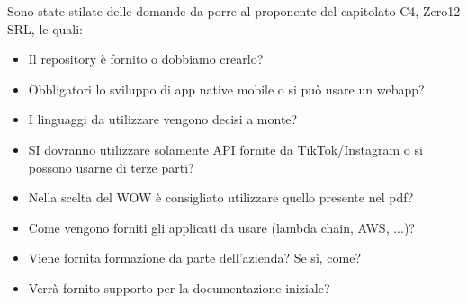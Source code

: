 \documentclass{classes/base}
\begin{document}
    Sono state stilate delle domande da porre al proponente del capitolato C4, Zero12 SRL, le quali:
    \begin{itemize}
        \item  Il repository è fornito o dobbiamo crearlo?
        \item  Obbligatori lo sviluppo di app native mobile o si può usare un webapp?
        \item  I linguaggi da utilizzare vengono decisi a monte?
        \item  SI dovranno utilizzare solamente API fornite da TikTok/Instagram o si possono usarne di terze parti?
        \item  Nella scelta del WOW è consigliato utilizzare quello presente nel pdf?
        \item  Come vengono forniti gli applicati da usare (lambda chain, AWS, ...)?
        \item  Viene fornita formazione da parte dell'azienda? Se sì, come?
        \item  Verrà fornito supporto per la documentazione iniziale?
    \end{itemize}
\end{document}
